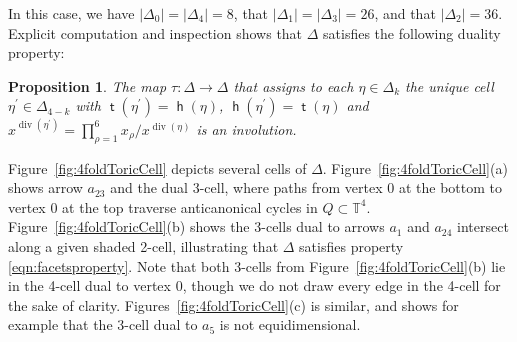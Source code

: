\documentclass[11pt,a4paper]{amsart}
\numberwithin{equation}{section}
\newtheorem{proposition}[theorem]{Proposition}
\theoremstyle{definition}
\theoremstyle{remark}
\renewcommand{\div}{\operatorname{div}}
\newcommand{\head}{\operatorname{\mathsf{h}}}
\newcommand{\tail}{\operatorname{\mathsf{t}}}
\begin{document}
In this case, we have $\vert \Delta_0\vert = \vert \Delta_4\vert = 8$, that $\vert \Delta_1\vert = \vert \Delta_3\vert = 26$, and that $\vert \Delta_2\vert = 36$. Explicit computation and inspection shows that $\Delta$ satisfies the following duality property:

\begin{proposition}
\label{prop:duality4fold}
The map $\tau\colon \Delta\to \Delta$ that assigns to each $\eta\in \Delta_k$ the unique cell $\eta^\prime\in \Delta_{4-k}$ with $\tail(\eta^\prime)=\head(\eta)$, $\head(\eta^\prime)=\tail(\eta)$ and $x^{\div(\eta^\prime)} = \prod_{\rho=1}^6x_\rho/x^{\div(\eta)}$ is an involution. 
\end{proposition}

Figure~\ref{fig:4foldToricCell} depicts several cells of $\Delta$. Figure~\ref{fig:4foldToricCell}(a) shows arrow $a_{23}$ and the dual 3-cell, where paths from vertex 0 at the bottom to vertex 0 at the top traverse anticanonical cycles in $Q\subset \mathbb{T}^4$.  Figure~\ref{fig:4foldToricCell}(b) shows the 3-cells dual to arrows $a_1$ and $a_{24}$ intersect along a given shaded 2-cell, illustrating that $\Delta$ satisfies property \eqref{eqn:facetsproperty}. Note that both 3-cells from Figure~\ref{fig:4foldToricCell}(b) lie in the 4-cell dual to vertex $0$, though we do not draw every edge in the 4-cell for the sake of clarity. Figures~\ref{fig:4foldToricCell}(c) is similar, and shows for example that the 3-cell dual to $a_5$ is not equidimensional.
\end{document}

